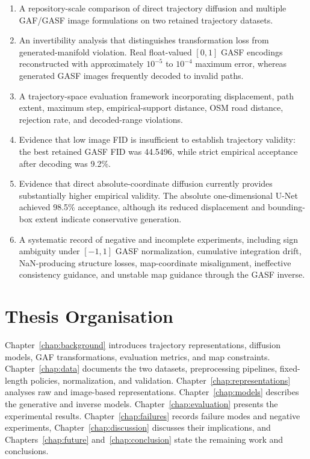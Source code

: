 \documentclass[12pt,a4paper,oneside]{report}
\begin{document}
\begin{enumerate}
  \item A repository-scale comparison of direct trajectory diffusion and multiple GAF/GASF image formulations on two retained trajectory datasets.
  \item An invertibility analysis that distinguishes transformation loss from generated-manifold violation. Real float-valued $[0,1]$ GASF encodings reconstructed with approximately $10^{-5}$ to $10^{-4}$ maximum error, whereas generated GASF images frequently decoded to invalid paths.
  \item A trajectory-space evaluation framework incorporating displacement, path extent, maximum step, empirical-support distance, OSM road distance, rejection rate, and decoded-range violations.
  \item Evidence that low image FID is insufficient to establish trajectory validity: the best retained GASF FID was 44.5496, while strict empirical acceptance after decoding was 9.2\%.
  \item Evidence that direct absolute-coordinate diffusion currently provides substantially higher empirical validity. The absolute one-dimensional U-Net achieved 98.5\% acceptance, although its reduced displacement and bounding-box extent indicate conservative generation.
  \item A systematic record of negative and incomplete experiments, including sign ambiguity under $[-1,1]$ GASF normalization, cumulative integration drift, NaN-producing structure losses, map-coordinate misalignment, ineffective consistency guidance, and unstable map guidance through the GASF inverse.
\end{enumerate}

\section{Thesis Organisation}

Chapter~\ref{chap:background} introduces trajectory representations, diffusion models, GAF transformations, evaluation metrics, and map constraints. Chapter~\ref{chap:data} documents the two datasets, preprocessing pipelines, fixed-length policies, normalization, and validation. Chapter~\ref{chap:representations} analyses raw and image-based representations. Chapter~\ref{chap:models} describes the generative and inverse models. Chapter~\ref{chap:evaluation} presents the experimental results. Chapter~\ref{chap:failures} records failure modes and negative experiments, Chapter~\ref{chap:discussion} discusses their implications, and Chapters~\ref{chap:future} and~\ref{chap:conclusion} state the remaining work and conclusions.
\end{document}
